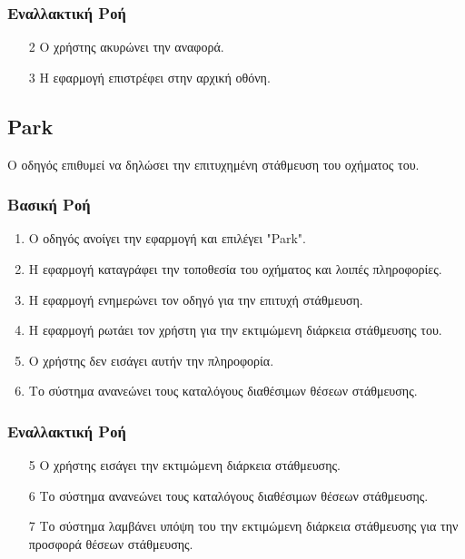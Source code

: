 \documentclass[11pt]{article}
\begin{document}
\subsubsection{Εναλλακτική Ροή}

\begin{enumerate}
    \item[2] Ο χρήστης ακυρώνει την αναφορά.
    \item[3] Η εφαρμογή επιστρέφει στην αρχική οθόνη.
\end{enumerate}

\subsection{Park}

Ο οδηγός επιθυμεί να δηλώσει την επιτυχημένη στάθμευση του οχήματος του.

\subsubsection{Βασική Ροή}

\begin{enumerate}
    \item O οδηγός ανοίγει την εφαρμογή και επιλέγει "Park".
    \item Η εφαρμογή καταγράφει την τοποθεσία του οχήματος και λοιπές πληροφορίες.
    \item Η εφαρμογή ενημερώνει τον οδηγό για την επιτυχή στάθμευση.
    \item Η εφαρμογή ρωτάει τον χρήστη για την εκτιμώμενη διάρκεια στάθμευσης του.
    \item Ο χρήστης δεν εισάγει αυτήν την πληροφορία.
    \item Το σύστημα ανανεώνει τους καταλόγους διαθέσιμων θέσεων στάθμευσης.
\end{enumerate}

\subsubsection{Εναλλακτική Ροή}

\begin{enumerate}
    \item[5] Ο χρήστης εισάγει την εκτιμώμενη διάρκεια στάθμευσης.
    \item[6] Το σύστημα ανανεώνει τους καταλόγους διαθέσιμων θέσεων στάθμευσης.
    \item[7] Το σύστημα λαμβάνει υπόψη του την εκτιμώμενη διάρκεια στάθμευσης
        για την προσφορά θέσεων στάθμευσης.
\end{enumerate}
\end{document}

